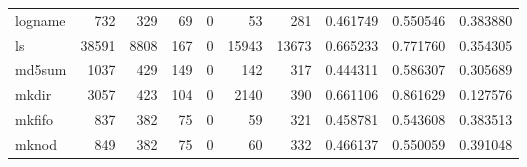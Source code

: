 \begin{tabular}{lrrrrrrrrr}
logname   &                                                732 &                                                329 &                                                 69 &                                                  0 &                                                 53 &                                                281 &                                           0.461749 &                               0.550546 &                             0.383880 \\
ls        &                                              38591 &                                               8808 &                                                167 &                                                  0 &                                              15943 &                                              13673 &                                           0.665233 &                               0.771760 &                             0.354305 \\
md5sum    &                                               1037 &                                                429 &                                                149 &                                                  0 &                                                142 &                                                317 &                                           0.444311 &                               0.586307 &                             0.305689 \\
mkdir     &                                               3057 &                                                423 &                                                104 &                                                  0 &                                               2140 &                                                390 &                                           0.661106 &                               0.861629 &                             0.127576 \\
mkfifo    &                                                837 &                                                382 &                                                 75 &                                                  0 &                                                 59 &                                                321 &                                           0.458781 &                               0.543608 &                             0.383513 \\
mknod     &                                                849 &                                                382 &                                                 75 &                                                  0 &                                                 60 &                                                332 &                                           0.466137 &                               0.550059 &                             0.391048 \\

\end{tabular}
